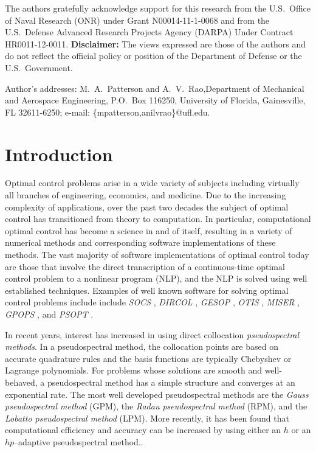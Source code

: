 \documentclass[prodmode,acmtecs]{acmsmall}
\begin{document}
\begin{bottomstuff}
The authors gratefully acknowledge support for this research from the 
U.S.~Office of Naval Research (ONR) under Grant N00014-11-1-0068 and 
from the U.S.~Defense Advanced Research Projects Agency (DARPA) Under 
Contract HR0011-12-0011.  {\bf Disclaimer:} The views expressed are
those of the authors and do not reflect the official policy or
position of the Department of Defense or the U.S.~Government. 

Author's addresses: M.~A.~Patterson and A.~V.~Rao,Department of
Mechanical and Aerospace Engineering, P.O.~Box 116250, 
University of Florida, Gainesville, FL 32611-6250; e-mail:
\{mpatterson,anilvrao\}@ufl.edu.  
\end{bottomstuff}

\maketitle

\section{Introduction}

Optimal control problems arise in a wide variety of subjects including
virtually all branches of engineering, economics, and medicine.  Due
to the increasing complexity of applications, over the  past two
decades the subject of optimal control has transitioned from theory to
computation.  In particular, computational optimal control has become
a science in and of itself, resulting in a variety of numerical
methods and corresponding software implementations of these methods.
The vast majority of software implementations of optimal control today
are those that involve the direct transcription of a continuous-time
optimal control problem to a nonlinear program (NLP), and the NLP is
solved using well established techniques.  Examples of
well known software for solving optimal control problems include
include {\em SOCS} \cite{Betts2}, {\em DIRCOL} \cite{vonStryk1}, 
{\em GESOP} \cite{Gesop1}, {\em OTIS} \cite{Vlases1}, {\em MISER}
\cite{Goh1}, {\em GPOPS} \cite{Rao8}, and {\em PSOPT} \cite{Becerra1}.

In recent years, interest has increased in using direct collocation {\em
  pseudospectral methods}.\cite{Elnagar1,Elnagar2,Vlassenbroeck1,Benson1,Benson2,Kameswaran1,Garg1,Garg2,Garg3,Darby1,Darby2,Patterson1} 
In a pseudospectral method, the collocation points are based on
accurate quadrature rules and the basis functions are typically
Chebyshev or Lagrange polynomials.  For problems whose solutions are
smooth and well-behaved, a pseudospectral method has a
simple structure and converges at an exponential rate. \cite{Canuto1,Fornberg1,Trefethen1}
The most well developed pseudospectral methods are the 
{\em Gauss pseudospectral method} (GPM)\cite{Benson1,Benson2}, 
the {\em Radau pseudospectral method}\cite{Kameswaran1,Garg1,Garg2}
(RPM), and the {\em Lobatto pseudospectral method}\cite{Elnagar1}
(LPM).  More recently, it has been found that computational efficiency
and accuracy can be increased by using either an $h$\cite{Kameswaran1}
or an $hp$--adaptive pseudospectral method.\cite{Darby1,Darby2}.   
\end{document}
